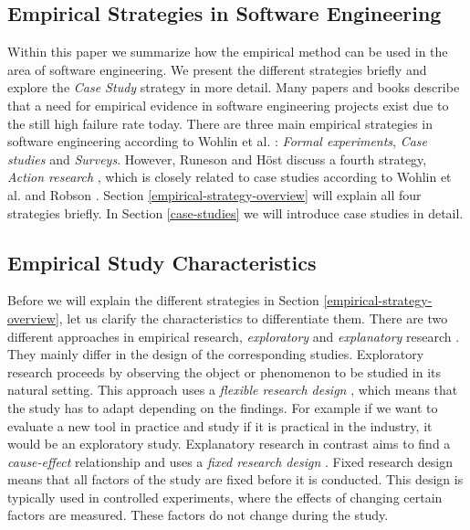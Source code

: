 \documentclass[runningheads]{llncs}
\begin{document}
\subsection{Empirical Strategies in Software Engineering}
Within this paper we summarize how the empirical method can be used in the area of software engineering. We present the different strategies briefly and explore the \textit{Case Study} strategy in more detail. Many papers and books describe that a need for empirical evidence in software engineering projects exist \cite{6312975,10-1007-3-540-57092-6-91,300094,Glass:1994:SC:624604.625401,Kitchenham:1995:CSM:624608.625491,Potts:1993:SRR:624601.625327,Tichy:1998:CSE:619029.620983,Wohlin:2012:ESE:2349018} due to the still high failure rate today. There are three main empirical strategies in software engineering according to Wohlin et al. \cite{Wohlin:2012:ESE:2349018}: \textit{Formal experiments}, \textit{Case studies} and \textit{Surveys}. However, Runeson and H{\"o}st \cite{Runeson2008} discuss a fourth strategy, \textit{Action research} \cite{Avison:1999:AR:291469.291479}, which is closely related to case studies according to Wohlin et al. \cite{Wohlin:2012:ESE:2349018} and Robson \cite{robson2002real}. Section \ref{empirical-strategy-overview} will explain all four strategies briefly. In Section \ref{case-studies} we will introduce case studies in detail.

\subsection{Empirical Study Characteristics}
Before we will explain the different strategies in Section \ref{empirical-strategy-overview}, let us clarify the characteristics to differentiate them. There are two different approaches in empirical research, \textit{exploratory} and \textit{explanatory} research \cite{Wohlin:2012:ESE:2349018}. They mainly differ in the design of the corresponding studies. Exploratory research proceeds by observing the object or phenomenon to be studied in its natural setting. This approach uses a \textit{flexible research design} \cite{anastas2000research}, which means that the study has to adapt depending on the findings. For example if we want to evaluate a new tool in practice and study if it is practical in the industry, it would be an exploratory study. Explanatory research in contrast aims to find a \textit{cause-effect} relationship and uses a \textit{fixed research design} \cite{anastas2000research}. Fixed research design means that all factors of the study are fixed before it is conducted. This design is typically used in controlled experiments, where the effects of changing certain factors are measured. These factors do not change during the study. 
\end{document}
